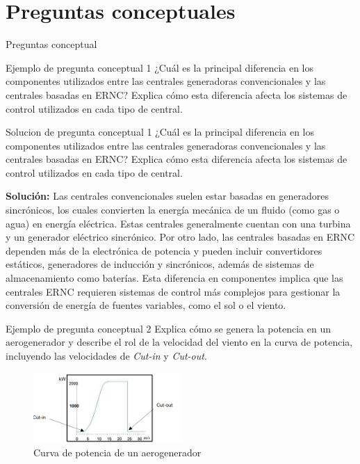 \documentclass[
    10pt,
    aspectratio=169,
    xcolor={dvipsnames},
    spanish,
    ]{beamer}
\begin{document}
\section{Preguntas conceptuales}
\begin{frame}{Preguntas conceptual}
\begin{block}{Ejemplo de pregunta conceptual 1}
  ¿Cuál es la principal diferencia en los componentes utilizados entre las centrales generadoras convencionales y las centrales basadas en ERNC? Explica cómo esta diferencia afecta los sistemas de control utilizados en cada tipo de central.
\end{block}
\end{frame}
\begin{frame}
\begin{block}{Solucion de pregunta conceptual 1}
  ¿Cuál es la principal diferencia en los componentes utilizados entre las centrales generadoras convencionales y las centrales basadas en ERNC? Explica cómo esta diferencia afecta los sistemas de control utilizados en cada tipo de central.
\end{block}
\textbf{Solución:} Las centrales convencionales suelen estar basadas en generadores sincrónicos, los cuales convierten la energía mecánica de un fluido (como gas o agua) en energía eléctrica. Estas centrales generalmente cuentan con una turbina y un generador eléctrico sincrónico. Por otro lado, las centrales basadas en ERNC dependen más de la electrónica de potencia y pueden incluir convertidores estáticos, generadores de inducción y sincrónicos, además de sistemas de almacenamiento como baterías. Esta diferencia en componentes implica que las centrales ERNC requieren sistemas de control más complejos para gestionar la conversión de energía de fuentes variables, como el sol o el viento.
\end{frame}
\begin{frame}
\begin{block}{Ejemplo de pregunta conceptual 2}
  Explica cómo se genera la potencia en un aerogenerador y describe el rol de la velocidad del viento en la curva de potencia, incluyendo las velocidades de \textit{Cut-in} y \textit{Cut-out}.
\end{block}
\begin{figure}
  \centering
  \includegraphics[width=0.5\textwidth]{Figure_1.png}
  \caption{Curva de potencia de un aerogenerador}
\end{figure}
\end{frame}
\end{document}
